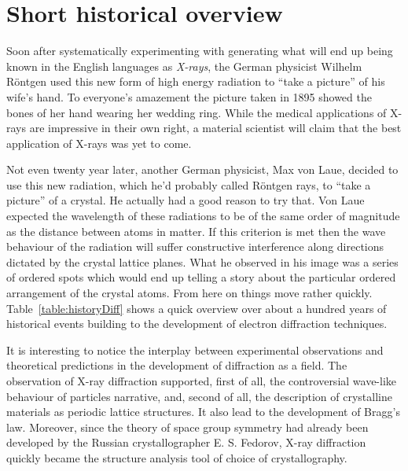 \section{Short historical overview}
\label{sec:history}
Soon after systematically experimenting with generating what will end up being known in the English languages as \textit{X-rays}, the German physicist Wilhelm R{\"o}ntgen used this new form of high energy radiation to ``take a picture'' of his wife’s hand. To everyone’s amazement the picture taken in 1895 showed the bones of her hand wearing her wedding ring. While the medical applications of X-rays are impressive in their own right, a material scientist will claim that the best application of X-rays was yet to come.

Not even twenty year later, another German physicist, Max von Laue, decided to use this new radiation, which he'd probably called R{\"o}ntgen rays,  to ``take a picture'' of a crystal. He actually had a good reason to try that. Von Laue expected the wavelength of these radiations to be of the same order of magnitude as the distance between atoms in matter. If this criterion is met then the wave behaviour of the radiation will suffer constructive interference along directions dictated by the crystal lattice planes. What he observed in his image was a series of ordered spots which would end up telling a story about the particular ordered arrangement of the crystal atoms. From here on things move rather quickly. Table~\ref{table:historyDiff} shows a quick overview over about a hundred years of historical events building to the development of electron diffraction techniques.

It is interesting to notice the interplay between experimental observations and theoretical predictions in the development of diffraction as a field. The observation of X-ray diffraction supported, first of all, the controversial wave-like behaviour of particles narrative, and, second of all, the description of crystalline materials as periodic lattice structures. It also lead to the development of Bragg's law. Moreover, since the theory of space group symmetry had already been developed by the Russian crystallographer E. S. Fedorov, X-ray diffraction quickly became the structure analysis tool of choice of crystallography.








  

\renewcommand{\arraystretch}{1.3}

